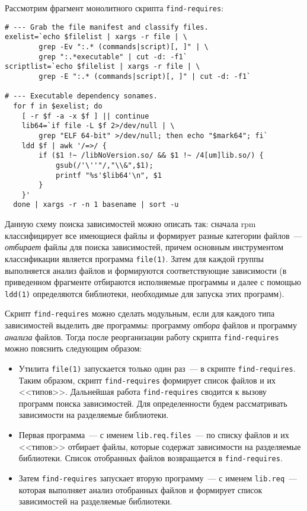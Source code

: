 \documentclass[russian,a4paper,12pt,titlepage]{article}
\begin{document}
Рассмотрим фрагмент монолитного скрипта \verb|find-requires|:
\begin{verbatim}
# --- Grab the file manifest and classify files.
exelist=`echo $filelist | xargs -r file | \
        grep -Ev ":.* (commands|script)[, ]" | \
        grep ":.*executable" | cut -d: -f1`
scriptlist=`echo $filelist | xargs -r file | \
        grep -E ":.* (commands|script)[, ]" | cut -d: -f1`

# --- Executable dependency sonames.
  for f in $exelist; do
    [ -r $f -a -x $f ] || continue
    lib64=`if file -L $f 2>/dev/null | \
        grep "ELF 64-bit" >/dev/null; then echo "$mark64"; fi`
    ldd $f | awk '/=>/ {
        if ($1 !~ /libNoVersion.so/ && $1 !~ /4[um]lib.so/) {
            gsub(/'\''"/,"\\&",$1);
            printf "%s'$lib64'\n", $1
        }
    }'
  done | xargs -r -n 1 basename | sort -u
\end{verbatim}
Данную схему поиска зависимостей можно описать так: сначала rpm классифицирует
все имеющиеся файлы и формирует разные категории файлов~--- \textit{отбирает} файлы
для поиска зависимостей, причем основным инструментом классификации является программа \verb|file(1)|.
Затем для каждой группы выполняется анализ файлов и формируются соответствующие зависимости (в
приведенном фрагменте отбираются исполняемые программы и далее с помощью \verb|ldd(1)| определяются
библиотеки, необходимые для запуска этих программ).

Скрипт \verb|find-requires| можно сделать модульным, если для каждого типа зависимостей выделить
две программы: программу \textit{отбора} файлов и программу \textit{анализа} файлов.  Тогда после реорганизации
работу скрипта \verb|find-requires| можно пояснить следующим образом:
\begin{itemize}
\item Утилита \verb|file(1)| запускается только один раз~--- в скрипте \verb|find-requires|.  Таким образом,
скрипт \verb|find-requires| формирует список файлов и их <<типов>>.  Дальнейшая работа \verb|find-requires|
сводится к вызову программ поиска зависимостей.  Для определенности будем рассматривать зависимости на разделяемые библиотеки.
\item Первая программа~--- с именем \verb|lib.req.files|~--- по списку файлов и их <<типов>> отбирает файлы,
которые содержат зависимости на разделяемые библиотеки.  Список отобранных файлов возвращается в \verb|find-requires|.
\item Затем \verb|find-requires| запускает вторую программу~--- с именем \verb|lib.req|~--- которая выполняет
анализ отобранных файлов и формирует список зависимостей на разделяемые библиотеки.
\end{itemize}
\end{document}
